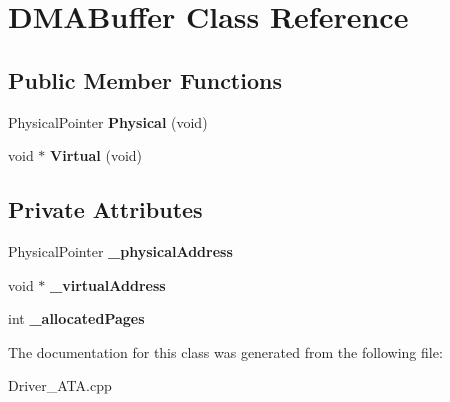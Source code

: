 \hypertarget{class_d_m_a_buffer}{}\section{D\+M\+A\+Buffer Class Reference}
\label{class_d_m_a_buffer}
\subsection*{Public Member Functions}
\begin{DoxyCompactItemize}
\item 
\mbox{\label{class_d_m_a_buffer_a7b6e8fc6ef0e90e40567c8c31e19063a}} 
Physical\+Pointer {\bfseries Physical} (void)
\item 
\mbox{\label{class_d_m_a_buffer_ac179dd93f3efc0bc6a641d8187f200ff}} 
void $\ast$ {\bfseries Virtual} (void)
\end{DoxyCompactItemize}
\subsection*{Private Attributes}
\begin{DoxyCompactItemize}
\item 
\mbox{\label{class_d_m_a_buffer_a9a6610851e6fba3b913ece79813343b9}} 
Physical\+Pointer {\bfseries \+\_\+physical\+Address}
\item 
\mbox{\label{class_d_m_a_buffer_ac292b7e9639bf901e49251e3f2b6bd3b}} 
void $\ast$ {\bfseries \+\_\+virtual\+Address}
\item 
\mbox{\label{class_d_m_a_buffer_a136908f02c3bc48b27c188cf3a79cf19}} 
int {\bfseries \+\_\+allocated\+Pages}
\end{DoxyCompactItemize}


The documentation for this class was generated from the following file\+:\begin{DoxyCompactItemize}
\item 
Driver\+\_\+\+A\+T\+A.\+cpp\end{DoxyCompactItemize}
